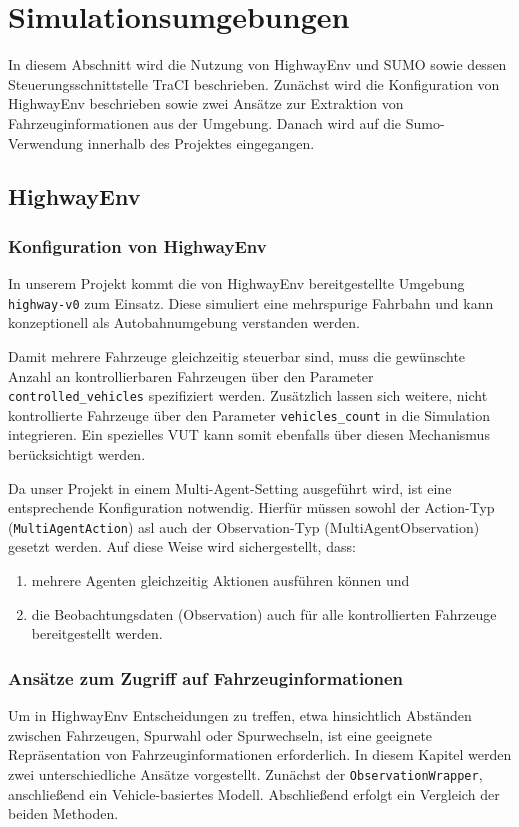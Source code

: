 \section{Simulationsumgebungen}
In diesem Abschnitt wird die Nutzung von HighwayEnv und SUMO sowie dessen Steuerungsschnittstelle TraCI beschrieben. Zunächst wird die Konfiguration von HighwayEnv beschrieben sowie zwei Ansätze zur Extraktion von Fahrzeuginformationen aus der Umgebung. Danach wird auf die Sumo-Verwendung innerhalb des Projektes eingegangen.
\subsection{HighwayEnv}
\subsubsection{Konfiguration von HighwayEnv}
In unserem Projekt kommt die von HighwayEnv bereitgestellte Umgebung \texttt{highway-v0} zum Einsatz. Diese simuliert eine mehrspurige Fahrbahn und kann konzeptionell als Autobahnumgebung verstanden werden. 

Damit mehrere Fahrzeuge gleichzeitig steuerbar sind, muss die gewünschte Anzahl an kontrollierbaren Fahrzeugen über den Parameter \texttt{controlled\_vehicles} spezifiziert werden. Zusätzlich lassen sich weitere, nicht kontrollierte Fahrzeuge über den Parameter \texttt{vehicles\_count} in die Simulation integrieren. Ein spezielles VUT kann somit ebenfalls über diesen Mechanismus berücksichtigt werden.

Da unser Projekt in einem Multi-Agent-Setting ausgeführt wird, ist eine entsprechende Konfiguration notwendig. Hierfür müssen sowohl der Action-Typ (\texttt{MultiAgentAction}) asl auch der Observation-Typ (MultiAgentObservation) gesetzt werden. Auf diese Weise wird sichergestellt, dass:
\begin{enumerate}
    \item mehrere Agenten gleichzeitig Aktionen ausführen können und
    \item die Beobachtungsdaten (Observation) auch für alle kontrollierten Fahrzeuge bereitgestellt werden.
\end{enumerate}

\subsubsection{Ansätze zum Zugriff auf Fahrzeuginformationen}
\label{sec:get_vehicle_info}
Um in HighwayEnv Entscheidungen zu treffen, etwa hinsichtlich Abständen zwischen Fahrzeugen, Spurwahl oder Spurwechseln, ist eine geeignete Repräsentation von Fahrzeuginformationen erforderlich. In diesem Kapitel werden zwei unterschiedliche Ansätze vorgestellt. Zunächst der \texttt{ObservationWrapper}, anschließend ein Vehicle-basiertes Modell. Abschließend erfolgt ein Vergleich der beiden Methoden.

